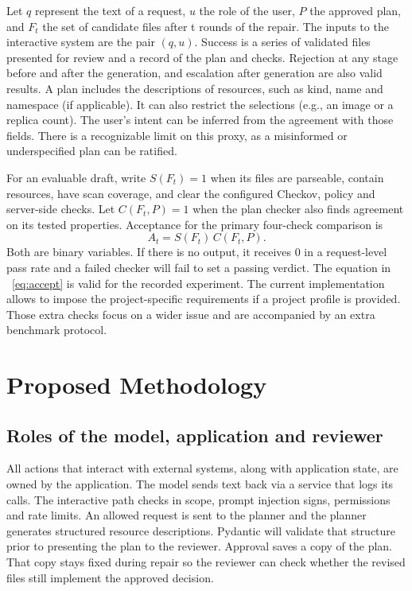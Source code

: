 \documentclass[12pt,onecolumn,draftclsnofoot]{IEEEtran}
\begin{document}
Let \(q\) represent the text of a request, \(u\) the role of the user, \(P\) the approved plan, and \(F_t\) the set of candidate files after t rounds of the repair. The inputs to the interactive system are the pair \((q,u)\). Success is a series of validated files presented for review and a record of the plan and checks. Rejection at any stage before and after the generation, and escalation after generation are also valid results. A plan includes the descriptions of resources, such as kind, name and namespace (if applicable). It can also restrict the selections (e.g., an image or a replica count). The user's intent can be inferred from the agreement with those fields. There is a recognizable limit on this proxy, as a misinformed or underspecified plan can be ratified.

For an evaluable draft, write \(S(F_t)=1\) when its files are parseable, contain resources, have scan coverage, and clear the configured Checkov, policy and server-side checks. Let \(C(F_t,P)=1\) when the plan checker also finds agreement on its tested properties. Acceptance for the primary four-check comparison is
\begin{equation}
 A_t=S(F_t)\,C(F_t,P).
 \label{eq:accept}
\end{equation}
Both are binary variables. If there is no output, it receives 0 in a request-level pass rate and a failed checker will fail to set a passing verdict. The equation in ~\eqref{eq:accept} is valid for the recorded experiment. The current implementation allows to impose the project-specific requirements if a project profile is provided. Those extra checks focus on a wider issue and are accompanied by an extra benchmark protocol.


\section{Proposed Methodology}
\subsection{Roles of the model, application and reviewer}
All actions that interact with external systems, along with application state, are owned by the application. The model sends text back via a service that logs its calls. The interactive path checks in scope, prompt injection signs, permissions and rate limits. An allowed request is sent to the planner and the planner generates structured resource descriptions. Pydantic will validate that structure prior to presenting the plan to the reviewer. Approval saves a copy of the plan. That copy stays fixed during repair so the reviewer can check whether the revised files still implement the approved decision.
\end{document}
